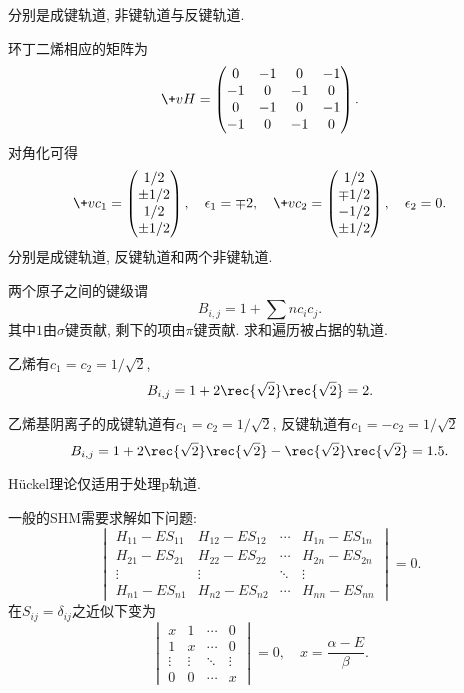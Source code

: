 \documentclass[hidelinks]{ctexart}
\begin{document}
分别是成键轨道, 非键轨道与反键轨道.
\par
环丁二烯相应的矩阵为
\[ \+vH = \begin{pmatrix}
    0 & -1 & 0 & -1 \\
    -1 & 0 & -1 & 0 \\
    0 & -1 & 0 & -1 \\
    -1 & 0 & -1 & 0
\end{pmatrix}. \]
对角化可得
\[ \+vc_1 = \begin{pmatrix}
    1/2 \\
    \pm 1/2 \\
    1/2 \\
    \pm 1/2
\end{pmatrix},\quad \epsilon_1 = \mp 2,\quad \+vc_2 = \begin{pmatrix}
    1/2 \\
    \mp 1/2 \\
    -1/2 \\
    \pm 1/2
\end{pmatrix},\quad \epsilon_2 = 0. \]
分别是成键轨道, 反键轨道和两个非键轨道.


\label{ssub:简单Huckel理论的应用}

两个原子之间的键级谓
\[ B_{i,j} = 1 + \sum nc_i c_j. \]
其中$1$由$\sigma$键贡献, 剩下的项由$\pi$键贡献. 求和遍历被占据的轨道.
\begin{ex}
    乙烯有$c_1 = c_2 = 1/\sqrt{2}$,
    \[ B_{i,j} = 1 + 2\rec{\sqrt{2}}\rec{\sqrt{2}} = 2. \]
\end{ex}
\begin{ex}
    乙烯基阴离子的成键轨道有$c_1 = c_2 = 1/\sqrt{2}$, 反键轨道有$c_1 = -c_2 = 1/\sqrt{2}$
    \[ B_{i,j} = 1 + 2\rec{\sqrt{2}}\rec{\sqrt{2}} - \rec{\sqrt{2}}\rec{\sqrt{2}} = 1.5. \]
\end{ex}
\begin{pitfall}
    H\"uckel理论仅适用于处理$\mathrm{p}$轨道.
\end{pitfall}
一般的SHM需要求解如下问题:
\[ \begin{vmatrix}
    H_{11} - ES_{11} & H_{12} - ES_{12} & \cdots & H_{1n} - ES_{1n} \\
    H_{21} - ES_{21} & H_{22} - ES_{22} & \cdots & H_{2n} - ES_{2n} \\
    \vdots & \vdots & \ddots & \vdots \\
    H_{n1} - ES_{n1} & H_{n2} - ES_{n2} & \cdots & H_{nn} - ES_{nn}
\end{vmatrix} = 0. \]
在$S_{ij} = \delta_{ij}$之近似下变为
\[ \begin{vmatrix}
    x & 1 & \cdots & 0 \\
    1 & x & \cdots & 0 \\
    \vdots & \vdots & \ddots & \vdots \\
    0 & 0 & \cdots & x
\end{vmatrix} = 0,\quad x = \frac{\alpha - E}{\beta}. \]
\end{document}
